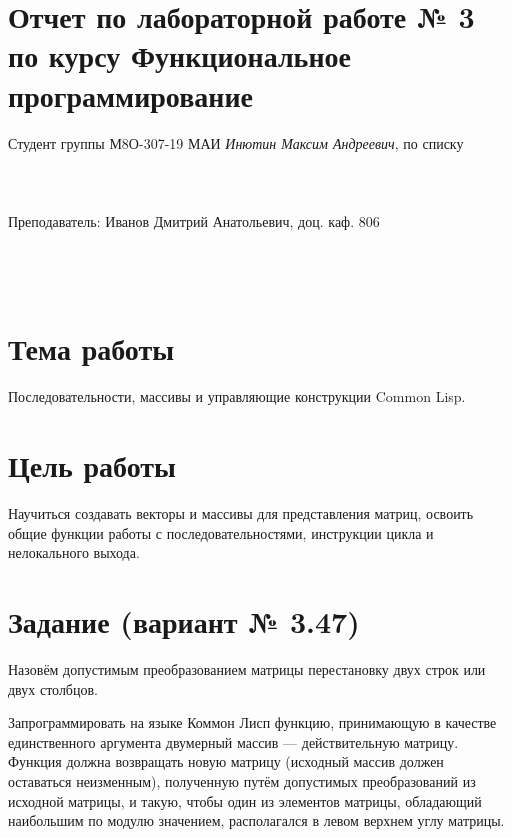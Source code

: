 \documentclass[12pt]{article}
\begin{document}
\section*{Отчет по лабораторной работе № 3 \\
по курсу \guillemotleft Функциональное программирование\guillemotright}
\begin{flushright}
Студент группы М8О-307-19 МАИ \textit{Инютин Максим Андреевич},  по списку \\
 \\
 \\
\ \\
Преподаватель: Иванов Дмитрий Анатольевич, доц. каф. 806 \\
 \\
 \\
 \\

\end{flushright}

\section{Тема работы}
Последовательности, массивы и управляющие конструкции Common Lisp.

\section{Цель работы}
Научиться создавать векторы и массивы для представления матриц, освоить общие функции работы с последовательностями, инструкции цикла и нелокального выхода.

\section{Задание (вариант № 3.47)}
Назовём допустимым преобразованием матрицы перестановку двух строк или двух столбцов.

Запрограммировать на языке Коммон Лисп функцию, принимающую в качестве единственного аргумента двумерный массив --- действительную матрицу. Функция должна возвращать новую матрицу (исходный массив должен оставаться неизменным), полученную путём допустимых преобразований из исходной матрицы, и такую, чтобы один из элементов матрицы, обладающий наибольшим по модулю значением, располагался в левом верхнем углу матрицы.
\end{document}
